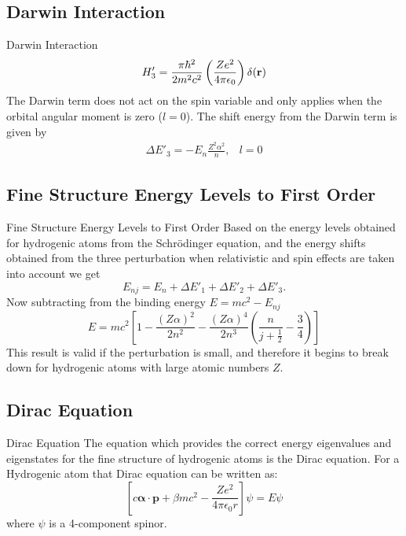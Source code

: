 \documentclass[aspectratio=1610,xcolor=dvipsnames,t]{beamer}
\begin{document}
	\subsection{Darwin Interaction}
    \begin{frame}{Darwin Interaction} 
	\begin{equation}
		H'_3 = \frac{\pi\hbar^2}{2m^2c^2} \left( \frac{Ze^2}{4\pi\epsilon_0} \right) \delta(\bf{r})
	\end{equation}
    The Darwin term does not act on the spin variable and only applies when
    the orbital angular moment is zero ($l=0$).
    The shift energy from the Darwin term is given by
    \begin{equation}
        \begin{array}{ll}
        \Delta E'_3 = -E_n \frac{Z^2 \alpha^2}{n} , & l = 0
        \end{array}
    \end{equation}
    \end{frame} 

    \subsection{Fine Structure Energy Levels to First Order}
    \begin{frame}{Fine Structure Energy Levels to First Order} 
    Based on the energy levels obtained for hydrogenic atoms from the Schr\"odinger equation,
    and the energy shifts obtained from the three perturbation when relativistic and
    spin effects are taken into account we get
    \begin{equation}
        E_{nj} = E_n + \Delta E'_1 + \Delta E'_2 + \Delta E'_3.
    \end{equation}
    Now subtracting from the binding energy $E = mc^2 - E_{nj}$ 
    \begin{equation}
        E = mc^2 \left[ 1 - \frac{(Z \alpha)^2}{2n^2} - \frac{(Z \alpha)^4}{2n^3} 
                        \left(
                            \frac{n}{j + \frac{1}{2}} - \frac{3}{4}
                        \right)
                    \right] 
    \end{equation}
    This result is valid if the perturbation is small, and therefore it begins to break down
    for hydrogenic atoms with large atomic numbers $Z$.
    \end{frame} 

    \subsection{Dirac Equation}
    \begin{frame}{Dirac Equation} 
    The equation which provides the correct energy eigenvalues and eigenstates for
    the fine structure of hydrogenic atoms is the Dirac equation. 
    For a Hydrogenic atom that Dirac equation can be written as:
    \begin{equation}
        \left[ c \mathbf{\alpha} \cdot \mathbf{p} + 
               \beta m c^2 - \frac{Ze^2}{4 \pi \epsilon_0 r}
        \right] \psi = E \psi
    \end{equation}
    where $\psi$ is a 4-component spinor.
    \end{frame} 
\end{document}
